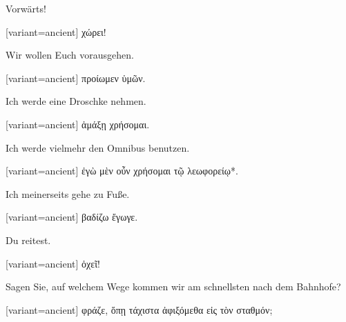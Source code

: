 Vorwärts!

\switchcolumn

\begin{greek}[variant=ancient]%
χώρει!

\end{greek}%
\switchcolumn*

Wir wollen Euch voraus\textcompwordmark{}gehen.

\switchcolumn

\begin{greek}[variant=ancient]%
προίωμεν ὑμῶν.

\end{greek}%
\switchcolumn*

Ich werde eine Droschke nehmen.

\switchcolumn

\begin{greek}[variant=ancient]%
ἁμάξῃ χρήσομαι.

\end{greek}%
\switchcolumn*

Ich werde vielmehr den Omnibus benutzen.

\switchcolumn

\begin{greek}[variant=ancient]%
ἐγὼ μὲν οὖν χρήσομαι τῷ λεωφορείῳ{*}.

\end{greek}%
\switchcolumn*

Ich meinerseits gehe zu Fuße.

\switchcolumn

\begin{greek}[variant=ancient]%
βαδίζω ἔγωγε.

\end{greek}%
\switchcolumn*

Du reitest.

\switchcolumn

\begin{greek}[variant=ancient]%
ὀχεῖ!

\end{greek}%
\switchcolumn*

Sagen Sie, auf welchem Wege kommen wir am schnellsten nach dem Bahnhofe?

\switchcolumn

\begin{greek}[variant=ancient]%
φράζε, ὅπῃ τάχιστα ἀφιξόμεθα εἰς τὸν σταθμόν;

\end{greek}%
\switchcolumn*

